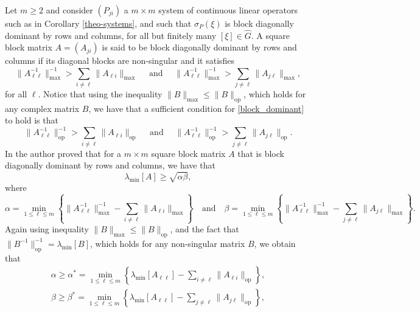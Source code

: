 \documentclass[11pt]{amsart}
\numberwithin{theorem}{section}
\numberwithin{equation}{section}
\theoremstyle{definition}
\numberwithin{example}{section}
\theoremstyle{definition}
\theoremstyle{definition}
\begin{document}
Let $m\geq 2$ and consider $(P_{ji})$ a $m\times m$ system of continuous linear operators such as in Corollary \ref{theo-systems}, and such that $\sigma_P(\xi)$ is block diagonally dominant by rows and columns, for all but finitely many $[\xi]\in\widehat{G}$. A square block matrix $A=(A_{ji})$ is said to be block diagonally dominant by rows and columns if its diagonal blocks are non-singular and it satisfies
\begin{equation}\label{block_dominant}
    \|A_{\ell\ell}^{-1}\|_{\max}^{-1}>\sum_{i\neq \ell}\|A_{\ell i}\|_{\max}\quad\text{ and }\quad \|A_{\ell\ell}^{-1}\|_{\max}^{-1}>\sum_{j\neq \ell}\|A_{j\ell}\|_{\max},
\end{equation}
for all $\ell$. Notice that using the inequality $\|B\|_{\max}\leq \|B\|_{\operatorname{op}}$, which holds for any complex matrix $B$, we have that a sufficient condition for \eqref{block_dominant} to hold is that
\begin{equation}\label{block_dominant2}
    \|A_{\ell\ell}^{-1}\|_{\operatorname{op}}^{-1}>\sum_{i\neq \ell}\|A_{\ell i}\|_{\operatorname{op}}\quad\text{ and }\quad \|A_{\ell\ell}^{-1}\|_{\operatorname{op}}^{-1}>\sum_{j\neq \ell}\|A_{j\ell}\|_{\operatorname{op}}.
\end{equation}
In \cite{VarahLowerBound} the author proved that for a $m\times m$ square block matrix $A$ that is block diagonally dominant by rows and columns, we have that  
\begin{equation*}
    \lambda_{\min}[A]\geq \sqrt{\alpha\beta},
\end{equation*}
where 
\begin{equation*}
    \alpha=\min_{1\leq \ell\leq m}\left\{\|A_{\ell\ell}^{-1}\|_{\max}^{-1}-\sum_{i\neq \ell}\|A_{\ell i}\|_{\max}\right\}\quad \text{and}\quad \beta=\min_{1\leq \ell\leq m}\left\{\|A_{\ell\ell}^{-1}\|_{\max}^{-1}-\sum_{j\neq \ell}\|A_{j \ell}\|_{\max}\right\}.
\end{equation*}
Again using inequality $\|B\|_{\max}\leq \|B\|_{\operatorname{op}}$, and the fact that $\|B^{-1}\|_{\operatorname{op}}^{-1}=\lambda_{\min}[B]$, which holds for any non-singular matrix $B$, we obtain that
\begin{align*}
     \alpha\geq\alpha^*= \min_{1\leq \ell\leq m}\left\{\lambda_{\min}[A_{\ell\ell}]-\sum_{i\neq \ell}\|A_{\ell i}\|_{\operatorname{op}}\right\},
     \end{align*}
     \begin{align*}
         \beta\geq \beta^* = \min_{1\leq \ell\leq m}\left\{\lambda_{\min}[A_{\ell\ell}]-\sum_{j\neq \ell}\|A_{j\ell}\|_{\operatorname{op}}\right\},
\end{align*}
\end{document}
